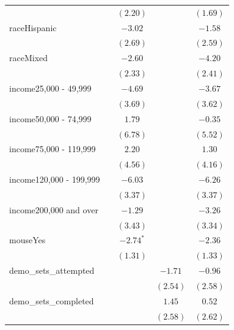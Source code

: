 \documentclass[
  12,
  letterpaper,
  DIV=11,
  numbers=noendperiod]{scrartcl}
\begin{document}
\begin{table}
{\begin{center}
\begin{tabular}{l c c c c}
                        &               & $(2.20)$      &              & $(1.69)$     \\
raceHispanic            &               & $-3.02$       &              & $-1.58$      \\
                        &               & $(2.69)$      &              & $(2.59)$     \\
raceMixed               &               & $-2.60$       &              & $-4.20$      \\
                        &               & $(2.33)$      &              & $(2.41)$     \\
income25,000 - 49,999   &               & $-4.69$       &              & $-3.67$      \\
                        &               & $(3.69)$      &              & $(3.62)$     \\
income50,000 - 74,999   &               & $1.79$        &              & $-0.35$      \\
                        &               & $(6.78)$      &              & $(5.52)$     \\
income75,000 - 119,999  &               & $2.20$        &              & $1.30$       \\
                        &               & $(4.56)$      &              & $(4.16)$     \\
income120,000 - 199,999 &               & $-6.03$       &              & $-6.26$      \\
                        &               & $(3.37)$      &              & $(3.37)$     \\
income200,000 and over  &               & $-1.29$       &              & $-3.26$      \\
                        &               & $(3.43)$      &              & $(3.34)$     \\
mouseYes                &               & $-2.74^{*}$   &              & $-2.36$      \\
                        &               & $(1.31)$      &              & $(1.33)$     \\
demo\_sets\_attempted   &               &               & $-1.71$      & $-0.96$      \\
                        &               &               & $(2.54)$     & $(2.58)$     \\
demo\_sets\_completed   &               &               & $1.45$       & $0.52$       \\
                        &               &               & $(2.58)$     & $(2.62)$     \\

\end{tabular}
\end{center}}
\end{table}
\end{document}
